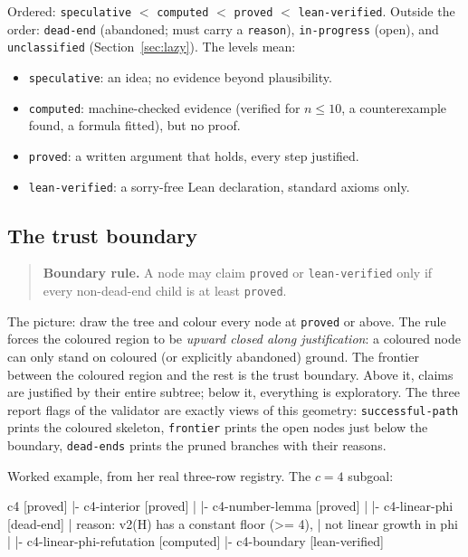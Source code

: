 \documentclass[11pt,a4paper]{article}
\newcommand{\level}[1]{\texttt{#1}}
\begin{document}
Ordered: \level{speculative} $<$ \level{computed} $<$ \level{proved} $<$
\level{lean-verified}. Outside the order: \level{dead-end} (abandoned; must
carry a \texttt{reason}), \level{in-progress} (open), and
\level{unclassified} (Section~\ref{sec:lazy}). The levels mean:

\begin{itemize}[nosep]
  \item \level{speculative}: an idea; no evidence beyond plausibility.
  \item \level{computed}: machine-checked evidence (verified for $n \le 10$,
    a counterexample found, a formula fitted), but no proof.
  \item \level{proved}: a written argument that holds, every step justified.
  \item \level{lean-verified}: a sorry-free Lean declaration, standard
    axioms only.
\end{itemize}

\subsection{The trust boundary}
\label{sec:boundary}

\begin{quote}
\textbf{Boundary rule.} A node may claim \level{proved} or
\level{lean-verified} only if every non-dead-end child is at least
\level{proved}.
\end{quote}

The picture: draw the tree and colour every node at \level{proved} or above.
The rule forces the coloured region to be \emph{upward closed along
justification}: a coloured node can only stand on coloured (or explicitly
abandoned) ground. The frontier between the coloured region and the rest is
the trust boundary. Above it, claims are justified by their entire subtree;
below it, everything is exploratory. The three report flags of the validator
are exactly views of this geometry: \texttt{successful-path} prints the
coloured skeleton, \texttt{frontier} prints the open nodes just below the
boundary, \texttt{dead-ends} prints the pruned branches with their reasons.

Worked example, from her real three-row registry. The $c=4$ subgoal:

\begin{code}
c4 [proved]
 |- c4-interior [proved]
 |    |- c4-number-lemma [proved]
 |    |- c4-linear-phi [dead-end]
 |         reason: v2(H) has a constant floor (>= 4),
 |                 not linear growth in phi
 |         |- c4-linear-phi-refutation [computed]
 |- c4-boundary [lean-verified]
\end{code}
\end{document}
